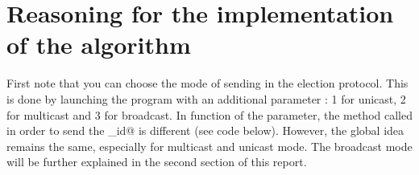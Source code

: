 \documentclass{article}
\begin{document}
\newpage


\section{Reasoning for the implementation of the algorithm}
First note that you can choose the mode of sending in the election protocol. This is done by launching the program with an additional parameter : 1 for unicast, 2 for multicast and 3 for broadcast. In function of the parameter, the method called in order to send the \verb@max_id@ is different (see code below). However, the global idea remains the same, especially for multicast and unicast mode. The broadcast mode will be further explained in the second section of this report.\\
\end{document}
